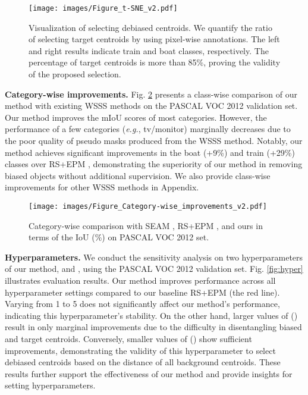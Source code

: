 \documentclass[10pt,twocolumn,letterpaper]{article}
\begin{document}
\begin{figure}
  \centering
  \texttt{[image: images/Figure\_t-SNE\_v2.pdf]}
\caption{
      Visualization of selecting debiased centroids. We quantify the ratio of selecting target centroids by using pixel-wise annotations. The left and right results indicate train and boat classes, respectively. The percentage of target centroids is more than 85\%, proving the validity of the proposed selection.
  }
  \label{fig:tsne}
\vspace{-0.4cm}
\end{figure}



\textbf{Category-wise improvements.} Fig. \ref{fig:category} presents a class-wise comparison of our method with existing WSSS methods \cite{wang2020self, jo2022recurseed} on the PASCAL VOC 2012 validation set. Our method improves the mIoU scores of most categories. However, the performance of a few categories (\emph{e.g.}, tv/monitor) marginally decreases due to the poor quality of pseudo masks produced from the WSSS method. Notably, our method achieves significant improvements in the boat (+9\%) and train (+29\%) classes over RS+EPM \cite{jo2022recurseed}, demonstrating the superiority of our method in removing biased objects without additional supervision. We also provide class-wise improvements for other WSSS methods \cite{ahn2019weakly, lee2021anti} in Appendix.

\begin{figure}
  \centering
  \texttt{[image: images/Figure\_Category-wise\_improvements\_v2.pdf]}
\caption{
      Category-wise comparison with SEAM \cite{wang2020self}, RS+EPM \cite{jo2022recurseed}, and ours in terms of the IoU (\%) on PASCAL VOC 2012 set. }
  \label{fig:category}
\vspace{-0.4cm}
\end{figure}







\textbf{Hyperparameters.} We conduct the sensitivity analysis on two hyperparameters of our method,  and , using the PASCAL VOC 2012 validation set. Fig. \ref{fig:hyper} illustrates evaluation results. Our method improves performance across all hyperparameter settings compared to our baseline RS+EPM \cite{jo2022recurseed} (the red line). Varying  from 1 to 5 does not significantly affect our method's performance, indicating this hyperparameter's stability. On the other hand, larger values of  () result in only marginal improvements due to the difficulty in disentangling biased and target centroids. Conversely, smaller values of  () show sufficient improvements, demonstrating the validity of this hyperparameter to select debiased centroids based on the distance of all background centroids. These results further support the effectiveness of our method and provide insights for setting hyperparameters.
\end{document}
